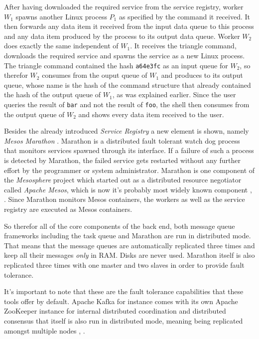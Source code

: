 After having downloaded the required service from the service registry,
worker $W_{1}$ spawns another Linux process $P_{1}$
as specified by the command it received. It then forwards any data
item it received from the input data queue to this process and
any data item produced by the process to its output data queue.
Worker $W_{2}$ does exactly the same independent of $W_{1}$.
It receives the triangle command, downloads the required service and
spawns the service as a new Linux process. The triangle command
contained the hash \texttt{a64e3fc} as an input queue for
$W_{2}$, so therefor $W_{2}$ consumes from the ouput queue of $W_{1}$
and produces to its output queue, whose name is the hash of the
command structure that already contained the hash of the output queue
of $W_{1}$, as was explained earlier. Since the user queries the
result of \texttt{bar} and not the result of \texttt{foo}, the shell
then consumes from the output queue of $W_{2}$ and shows every data
item received to the user.

Besides the already introduced \textit{Service Registry} a new element
is shown, namely \textit{Mesos Marathon} \cite{marathon}.
Marathon is a distributed
fault tolerant watch dog process that monitors services spawned
through its interface. If a failure of such a process is detected
by Marathon, the failed service gets restarted without any further
effort by the programmer or system administrator. Marathon is one
component of the \textit{Mesosphere} project which started out
as a distributed resource negotiator called \textit{Apache Mesos},
which is now it's probably most widely known component
\cite{mesosphere}, \cite{mesos}. Since Marathon monitors
Mesos containers, the workers as well as the service registry are
executed as Mesos containers.
\newline

So therefor all of the core components of the back end, both message
queue frameworks including the task queue and Marathon are run in
distributed mode. That means that the message queues are automatically
replicated three times and keep all their messages \textit{only} in RAM.
Disks are never used. Marathon itself is also replicated three times
with one master and two slaves in order to provide fault tolerance.

It's important to note that these are the fault tolerance capabilities
that these tools offer by default. Apache Kafka for instance comes
with its own Apache ZooKeeper instance for internal distributed
coordination and distributed consensus that itself is also run in
distributed mode, meaning being replicated amongst multiple nodes
\cite{zk}, \cite{zkpaper}.

